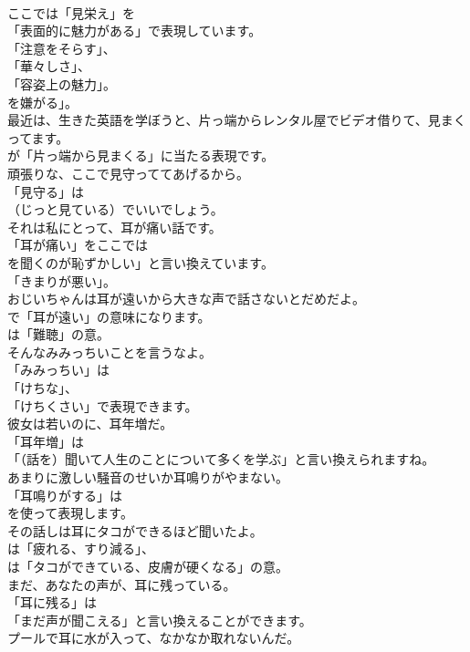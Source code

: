 \documentclass[8pt]{extreport}
\begin{document}
\begin{CJK}{UTF8}{min}
\\	ここでは「見栄え」を
\\	「表面的に魅力がある」で表現しています。
\\	「注意をそらす」、
\\	「華々しさ」、
\\	「容姿上の魅力」。
\\	を嫌がる」。	
\\	最近は、生きた英語を学ぼうと、片っ端からレンタル屋でビデオ借りて、見まくってます。 
\\	が「片っ端から見まくる」に当たる表現です。	
\\	頑張りな、ここで見守っててあげるから。 
\\	「見守る」は 
\\	（じっと見ている）でいいでしょう。	
\\	それは私にとって、耳が痛い話です。 
\\	「耳が痛い」をここでは
\\	を聞くのが恥ずかしい」と言い換えています。
\\	「きまりが悪い」。	
\\	おじいちゃんは耳が遠いから大きな声で話さないとだめだよ。 
\\	で「耳が遠い」の意味になります。
\\	は「難聴」の意。	
\\	そんなみみっちいことを言うなよ。 
\\	「みみっちい」は
\\	「けちな」、
\\	「けちくさい」で表現できます。	
\\	彼女は若いのに、耳年増だ。 
\\	「耳年増」は
\\	「（話を）聞いて人生のことについて多くを学ぶ」と言い換えられますね。	
\\	あまりに激しい騒音のせいか耳鳴りがやまない。 
\\	「耳鳴りがする」は
\\	を使って表現します。	
\\	その話しは耳にタコができるほど聞いたよ。 
\\	は「疲れる、すり減る」、
\\	は「タコができている、皮膚が硬くなる」の意。	
\\	まだ、あなたの声が、耳に残っている。 
\\	「耳に残る」は
\\	「まだ声が聞こえる」と言い換えることができます。	
\\	プールで耳に水が入って、なかなか取れないんだ。 

\end{CJK}
\end{document}
